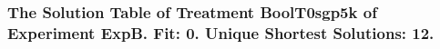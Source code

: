 \begin{frame}
 \fontsize{8pt}{9pt}\selectfont
 \frametitle{ The Solution Table of Treatment BoolT0sgp5k of Experiment ExpB. Fit: 0. Unique Shortest Solutions: 12. }

 \label{ExpBSolutionTable003.tex}  
 \end{frame}

